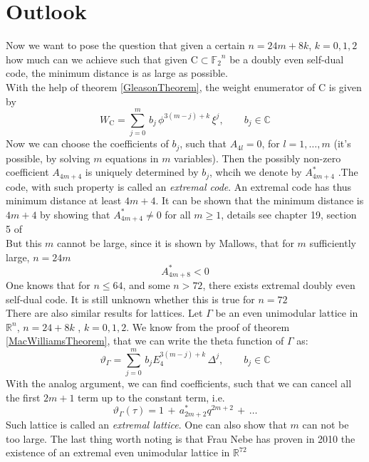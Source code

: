 \documentclass{article}
\numberwithin{equation}{theorem}
\numberwithin{figure}{theorem}
\newcommand{\Ftwo}{\ensuremath{\mathbb{F}_2}}
\newcommand{\simpleCodes}{\ensuremath{\mathrm{C}}}
\newcommand{\thetaFunction}[1]{\ensuremath{\vartheta_{#1}}}
\newcommand{\Real}{\ensuremath{\mathbb{R}}}
\newcommand{\Complex}{\ensuremath{\mathbb{C}}}
\begin{document}
\section{Outlook}
Now we want to pose the question that given a certain $n = 24m + 8k$, $k = 0,1,2$ how much can we achieve such that given $\simpleCodes \subset \Ftwo^n$ be a doubly even self-dual code, the minimum distance is as large as possible.\\
With the help of theorem \ref{GleasonTheorem}, the weight enumerator of $\simpleCodes$ is given by
\[
	W_{\simpleCodes} = \sum_{j = 0}^{m}\,b_j\,\phi^{3(m-j)+k} \,\xi^j, \qquad b_j \in \Complex
\]
Now we can choose the coefficients of $b_j$, such that $A_{4l} = 0$, for $l = 1,\ldots,m$ (it's possible, by solving $m$ equations in $m$ variables). Then the possibly non-zero coefficient $A_{4m + 4}$ is uniquely determined by $b_j$, whcih we denote by $A_{4m+4}^{*}$ .The code, with such property is called an \emph{extremal code}. An extremal code has thus minimum distance at least $4m + 4$. It can be shown that the minimum distance is $4m + 4$ by showing that $A_{4m + 4}^* \neq 0$ for all $m \geq 1$, details see chapter 19, section 5 of \cite{macwilliams1977theory}\\
But this $m$ cannot be large, since it is shown by Mallows, that for $m$ sufficiently large, $n = 24m$
\[
	A_{4m + 8}^* < 0
\]
One knows that for $n \leq 64$, and some $n > 72$, there exists extremal doubly even self-dual code. It is still unknown whether this is true for $n = 72$\\
There are also similar results for lattices. Let $\Gamma$ be an even unimodular lattice in $\Real^n$, $n = 24 + 8k$ , $k = 0,1,2$. We know from the proof of theorem \ref{MacWilliamsTheorem}, that we can write the theta function of $\Gamma$ as:
\[
	\thetaFunction{\Gamma} = \sum_{j = 0}^m \, b_j E_4^{3(m - j) + k} \, \Delta^j,	\qquad b_j \in \Complex
\]
With the analog argument, we can find coefficients, such that we can cancel all the first $2m + 1$ term up to the constant term, i.e.
\[
	\thetaFunction{\Gamma}(\tau) = 1 \,+\, a_{2m + 2}^* q^{2m + 2}\, +\, \ldots
\]
Such lattice is called an \emph{extremal lattice}. One can also show that $m$ can not be too large. The last thing worth noting is that Frau Nebe has proven in 2010 the existence of an extremal even unimodular lattice in $\Real^{72}$

\newpage


\end{document}
